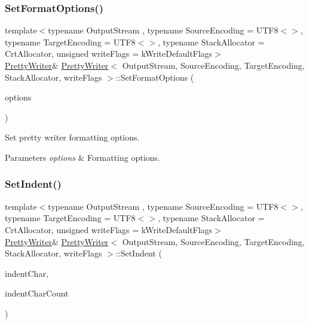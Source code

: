 \subsubsection{\texorpdfstring{Set\+Format\+Options()}{SetFormatOptions()}}
{\footnotesize\ttfamily template$<$typename Output\+Stream , typename Source\+Encoding  = U\+T\+F8$<$$>$, typename Target\+Encoding  = U\+T\+F8$<$$>$, typename Stack\+Allocator  = Crt\+Allocator, unsigned write\+Flags = k\+Write\+Default\+Flags$>$ \\
\hyperlink{a02228}{Pretty\+Writer}\& \hyperlink{a02228}{Pretty\+Writer}$<$ Output\+Stream, Source\+Encoding, Target\+Encoding, Stack\+Allocator, write\+Flags $>$\+::Set\+Format\+Options (\begin{DoxyParamCaption}\item[{Pretty\+Format\+Options}]{options }\end{DoxyParamCaption})\hspace{0.3cm}{\ttfamily [inline]}}



Set pretty writer formatting options. 


\begin{DoxyParams}{Parameters}
{\em options} & Formatting options. \\
\hline
\end{DoxyParams}
\mbox{\label{a02228_ad307b4c8d61af25042d0adcd0910c19a}} 
\subsubsection{\texorpdfstring{Set\+Indent()}{SetIndent()}}
{\footnotesize\ttfamily template$<$typename Output\+Stream , typename Source\+Encoding  = U\+T\+F8$<$$>$, typename Target\+Encoding  = U\+T\+F8$<$$>$, typename Stack\+Allocator  = Crt\+Allocator, unsigned write\+Flags = k\+Write\+Default\+Flags$>$ \\
\hyperlink{a02228}{Pretty\+Writer}\& \hyperlink{a02228}{Pretty\+Writer}$<$ Output\+Stream, Source\+Encoding, Target\+Encoding, Stack\+Allocator, write\+Flags $>$\+::Set\+Indent (\begin{DoxyParamCaption}\item[{Ch}]{indent\+Char,  }\item[{unsigned}]{indent\+Char\+Count }\end{DoxyParamCaption})\hspace{0.3cm}{\ttfamily [inline]}}



